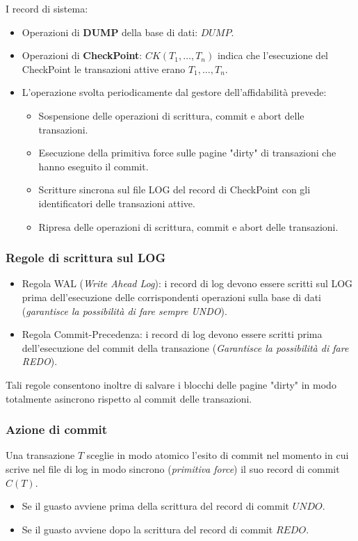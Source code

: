 \documentclass[oneside,a4paper,11pt]{book}
\theoremstyle{italicstyle}
\theoremstyle{normStyle}
\begin{document}
I record di sistema:
\begin{itemize}
    \item Operazioni di \textbf{DUMP} della base di dati: $DUMP$.
    \item Operazioni di \textbf{CheckPoint}: $CK(T_1,\dots,T_n)$ indica che l'esecuzione 
    del CheckPoint le transazioni attive erano $T_1, \dots, T_n$.
    \item L'operazione svolta periodicamente dal gestore dell'affidabilità prevede:
    \begin{itemize}
        \item Sospensione delle operazioni di scrittura, commit e abort delle transazioni.
        \item Esecuzione della primitiva force sulle pagine "dirty" di transazioni che hanno eseguito il commit.
        \item Scritture sincrona sul file LOG del record di CheckPoint con gli 
        identificatori delle transazioni attive.
        \item Ripresa delle operazioni di scrittura, commit e abort delle transazioni.
    \end{itemize}
\end{itemize}
\subsubsection{Regole di scrittura sul LOG}
\begin{itemize}
    \item Regola WAL (\textit{Write Ahead Log}): i record di log devono 
    essere scritti sul LOG prima dell'esecuzione delle corrispondenti operazioni sulla base di dati 
    (\textit{garantisce la possibilità di fare sempre UNDO}).
    \item Regola Commit-Precedenza: i record di log devono essere 
    scritti prima dell'esecuzione del commit della transazione (\textit{Garantisce 
    la possibilità di fare REDO}).
\end{itemize}
Tali regole consentono inoltre di salvare i blocchi delle pagine "dirty" in 
modo totalmente asincrono rispetto al commit delle transazioni.
\subsubsection{Azione di commit}
Una transazione $T$ sceglie in modo atomico l'esito di commit nel momento in cui 
scrive nel file di log in modo sincrono (\textit{primitiva force}) il suo record di commit $C(T)$.
\begin{itemize}
    \item Se il guasto avviene prima della scrittura del record di commit $UNDO$.
    \item Se il guasto avviene dopo la scrittura del record di commit $REDO$.
\end{itemize}
\end{document}
